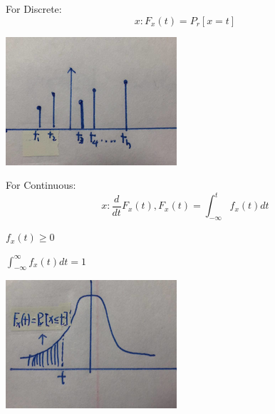 \documentclass{article}
\begin{document}
{{            \begin{enumerate}{
                \item For Discrete:
                    \[ x: F_x(t)= P_r[x= t] \]
                    \begin{center}{
                        \includegraphics{discretepdf.png}
                    }
                    \end{center}
                \item For Continuous: 
                    \[ x: \frac{d}{dt}F_x(t),  F_x(t)=\int_{-\infty}^{t}f_x(t)dt \]
                    \begin{enumerate}[i]{
                        \item $f_x(t)\ge 0$
                        \item $\int_{-\infty}^{\infty}f_x(t)dt= 1$
                    }
                    \end{enumerate}

                    \begin{center}{
                        \includegraphics{continupdf.png}
                    }
                    \end{center}
            }
            \end{enumerate}  
        }
    }
\end{document}

